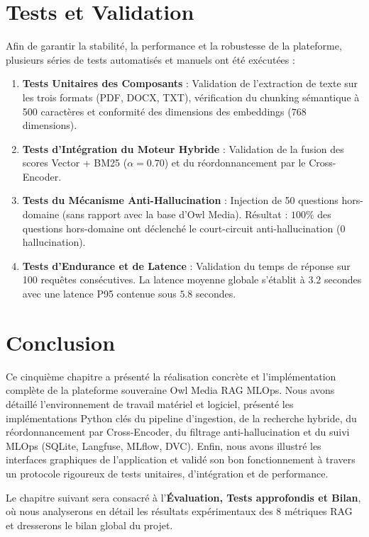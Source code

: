 \section{Tests et Validation}
Afin de garantir la stabilité, la performance et la robustesse de la plateforme, plusieurs séries de tests automatisés et manuels ont été exécutées :
\begin{enumerate}
    \item \textbf{Tests Unitaires des Composants} : Validation de l'extraction de texte sur les trois formats (PDF, DOCX, TXT), vérification du chunking sémantique à 500 caractères et conformité des dimensions des embeddings ($768$ dimensions).
    \item \textbf{Tests d'Intégration du Moteur Hybride} : Validation de la fusion des scores Vector + BM25 ($\alpha=0.70$) et du réordonnancement par le Cross-Encoder.
    \item \textbf{Tests du Mécanisme Anti-Hallucination} : Injection de 50 questions hors-domaine (sans rapport avec la base d'Owl Media). Résultat : $100\%$ des questions hors-domaine ont déclenché le court-circuit anti-hallucination ($0$ hallucination).
    \item \textbf{Tests d'Endurance et de Latence} : Validation du temps de réponse sur 100 requêtes consécutives. La latence moyenne globale s'établit à $3.2$ secondes avec une latence P95 contenue sous $5.8$ secondes.
\end{enumerate}

\section{Conclusion}
Ce cinquième chapitre a présenté la réalisation concrète et l'implémentation complète de la plateforme souveraine Owl Media RAG MLOps. Nous avons détaillé l'environnement de travail matériel et logiciel, présenté les implémentations Python clés du pipeline d'ingestion, de la recherche hybride, du réordonnancement par Cross-Encoder, du filtrage anti-hallucination et du suivi MLOps (SQLite, Langfuse, MLflow, DVC). Enfin, nous avons illustré les interfaces graphiques de l'application et validé son bon fonctionnement à travers un protocole rigoureux de tests unitaires, d'intégration et de performance.

Le chapitre suivant sera consacré à l'\textbf{Évaluation, Tests approfondis et Bilan}, où nous analyserons en détail les résultats expérimentaux des 8 métriques RAG et dresserons le bilan global du projet.
